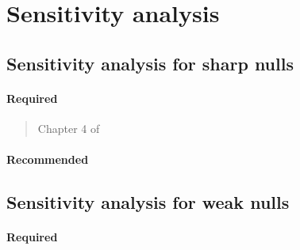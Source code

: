 \documentclass[12pt]{article}
\begin{document}
\begin{verse}
\end{verse}

\begin{verse}
\end{verse}

\section{Sensitivity analysis}

\subsection{Sensitivity analysis for sharp nulls}

\paragraph*{Required}

\begin{verse} Chapter 4 of  \end{verse}

\begin{verse}  \end{verse}

\paragraph*{Recommended}

\begin{verse}  \end{verse}

\begin{verse}  \end{verse}

\subsection{Sensitivity analysis for weak nulls}

\paragraph*{Required}

\begin{verse}  \end{verse}
\end{document}
